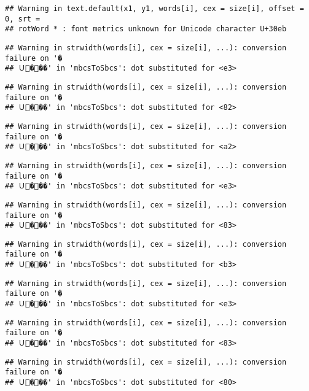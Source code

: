\documentclass[]{article}
\begin{document}
\begin{verbatim}
## Warning in text.default(x1, y1, words[i], cex = size[i], offset = 0, srt =
## rotWord * : font metrics unknown for Unicode character U+30eb
\end{verbatim}

\begin{verbatim}
## Warning in strwidth(words[i], cex = size[i], ...): conversion failure on '�
## Ｕ���' in 'mbcsToSbcs': dot substituted for <e3>
\end{verbatim}

\begin{verbatim}
## Warning in strwidth(words[i], cex = size[i], ...): conversion failure on '�
## Ｕ���' in 'mbcsToSbcs': dot substituted for <82>
\end{verbatim}

\begin{verbatim}
## Warning in strwidth(words[i], cex = size[i], ...): conversion failure on '�
## Ｕ���' in 'mbcsToSbcs': dot substituted for <a2>
\end{verbatim}

\begin{verbatim}
## Warning in strwidth(words[i], cex = size[i], ...): conversion failure on '�
## Ｕ���' in 'mbcsToSbcs': dot substituted for <e3>
\end{verbatim}

\begin{verbatim}
## Warning in strwidth(words[i], cex = size[i], ...): conversion failure on '�
## Ｕ���' in 'mbcsToSbcs': dot substituted for <83>
\end{verbatim}

\begin{verbatim}
## Warning in strwidth(words[i], cex = size[i], ...): conversion failure on '�
## Ｕ���' in 'mbcsToSbcs': dot substituted for <b3>
\end{verbatim}

\begin{verbatim}
## Warning in strwidth(words[i], cex = size[i], ...): conversion failure on '�
## Ｕ���' in 'mbcsToSbcs': dot substituted for <e3>
\end{verbatim}

\begin{verbatim}
## Warning in strwidth(words[i], cex = size[i], ...): conversion failure on '�
## Ｕ���' in 'mbcsToSbcs': dot substituted for <83>
\end{verbatim}

\begin{verbatim}
## Warning in strwidth(words[i], cex = size[i], ...): conversion failure on '�
## Ｕ���' in 'mbcsToSbcs': dot substituted for <80>
\end{verbatim}
\end{document}
